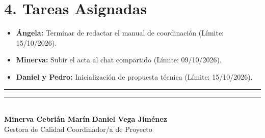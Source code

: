 \section*{4. Tareas Asignadas}
\begin{itemize}
    \item \textbf{Ángela:} Terminar de redactar el manual de coordinación (Límite: 15/10/2026).
    \item \textbf{Minerva:} Subir el acta al chat compartido (Límite: 09/10/2026).
     \item \textbf{Daniel y Pedro:} Inicialización de propuesta técnica (Límite: 15/10/2026).
\end{itemize}

\noindent
\rule{6cm}{0.4pt} \hfill \rule{6cm}{0.4pt}\\
\textbf{Minerva Cebrián Marín} \hfill \textbf{Daniel Vega Jiménez}\\
Gestora de Calidad \hfill Coordinador/a de Proyecto
